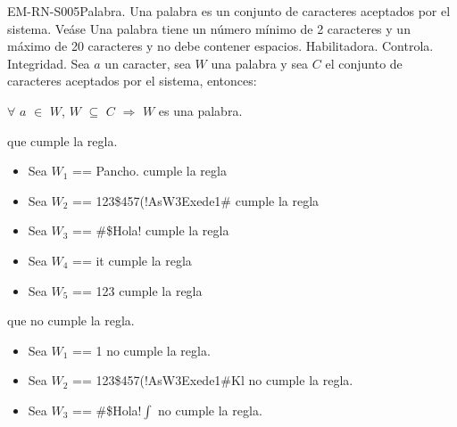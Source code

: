 \begin{BussinesRule}{EM-RN-S005}{Palabra.} 
	\BRitem[Descripción:] Una palabra es un conjunto de caracteres aceptados por el sistema.
	Veáse 
	Una palabra tiene un número mínimo de 2 caracteres y un máximo de 20 caracteres y no debe
	contener espacios.
	\BRitem[Tipo:] Habilitadora.
	\BRitem[Nivel:] Controla.
	\BRitem[Clase:] Integridad.
	\BRitem[Sentenia: ] Sea $a$ un caracter, sea $W$ una palabra y sea $C$ el conjunto de caracteres
	aceptados por el sistema, entonces:
	\begin{center}
		$\forall$ $a$ $\in$ $W$, $W$ $\subseteq$ $C$ $\Rightarrow$ $W$ es una palabra.
	\end{center}
	 que cumple la regla.
		\begin{itemize}
			\item Sea $W_{1}$ == Pancho. cumple la regla
			\item Sea $W_{2}$ == 123\$457(!AsW3Exede1\# cumple la regla
			\item Sea $W_{3}$ == \#\$Hola! cumple la regla
			\item Sea $W_{4}$ == it cumple la regla
			\item Sea $W_{5}$ == 123 cumple la regla
		\end{itemize}
	 que no cumple la regla.
		\begin{itemize}
			\item Sea $W_{1}$ == 1 no cumple la regla.
			\item Sea $W_{2}$ == 123\$457(!AsW3Exede1\#Kl no cumple la regla.
			\item Sea $W_{3}$ == \#\$Hola!$\int$ no cumple la regla.
		\end{itemize}
\end{BussinesRule}


